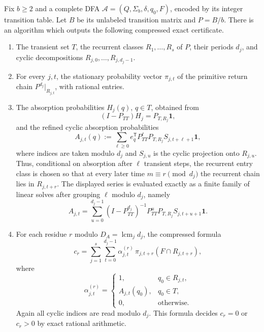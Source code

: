 \begin{theorem}
  \label{thm:effective-fixed-dfa-prime-obstruction}
  Fix \(b\ge2\) and a complete DFA
  \(\mathcal A=(Q,\Sigma_b,\delta,q_0,F)\), encoded by its integer
  transition table. Let \(B\) be its unlabeled transition matrix and
  \(P=B/b\). There is an algorithm which outputs the following
  compressed exact certificate.
  \begin{enumerate}[label=\textup{(\alph*)}]
    \item The transient set \(T\), the recurrent classes
    \(R_1,\dots,R_s\) of \(P\), their periods \(d_j\), and cyclic
    decompositions \(R_{j,0},\dots,R_{j,d_j-1}\).
    \item For every \(j,t\), the stationary probability vector
    \(\pi_{j,t}\) of the primitive return chain
    \(P^{d_j}|_{R_{j,t}}\), with rational entries.
    \item The absorption probabilities \(H_j(q)\), \(q\in T\), obtained
    from
    \[
      (I-P_{TT})H_j=P_{T,R_j}\mathbf 1,
    \]
    and the refined cyclic absorption probabilities
    \[
      A_{j,t}(q)
      :=\sum_{\ell\ge0}
        e_q^{\mathsf T}P_{TT}^{\ell}P_{T,R_j}
        S_{j,t+\ell+1}\mathbf 1 ,
    \]
    where indices are taken modulo \(d_j\) and
    \(S_{j,u}\) is the cyclic projection onto \(R_{j,u}\).
    Thus, conditional on absorption after \(\ell\) transient steps, the
    recurrent entry class is chosen so that at every later time
    \(m\equiv r\pmod {d_j}\) the recurrent chain lies in
    \(R_{j,t+r}\). The displayed series is evaluated exactly as a
    finite family of linear solves after grouping \(\ell\) modulo
    \(d_j\), namely
    \[
      A_{j,t}
      =
      \sum_{u=0}^{d_j-1}
      (I-P_{TT}^{d_j})^{-1}P_{TT}^uP_{T,R_j}
      S_{j,t+u+1}\mathbf 1 .
    \]
    \item For each residue \(r\) modulo
    \(D_A=\operatorname{lcm}_j d_j\), the compressed formula
    \[
      c_r=
      \sum_{j=1}^s\sum_{t=0}^{d_j-1}
      \alpha_{j,t}^{(r)}\,
      \pi_{j,t+r}(F\cap R_{j,t+r}),
      \tag{\(*\)}
      \label{eq:compressed-cr}
    \]
    where
    \[
      \alpha_{j,t}^{(r)}=
      \begin{cases}
        1, & q_0\in R_{j,t},\\
        A_{j,t}(q_0), & q_0\in T,\\
        0, & \text{otherwise.}
      \end{cases}
    \]
    Again all cyclic indices are read modulo \(d_j\). This formula
    decides \(c_r=0\) or \(c_r>0\) by exact rational arithmetic.

\end{enumerate}
\end{theorem}
